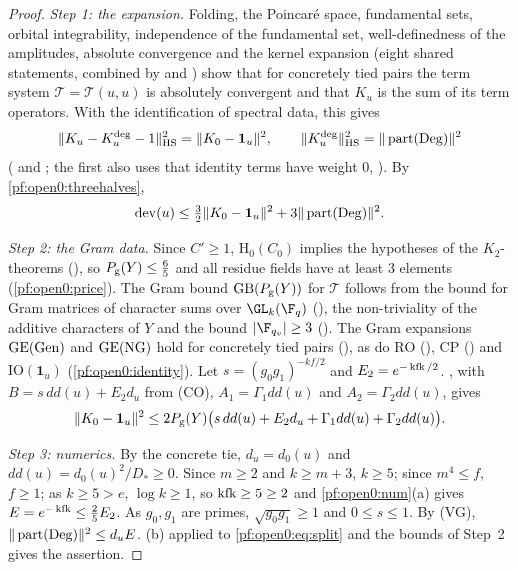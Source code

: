 \begin{proof}
\emph{Step 1: the expansion.} Folding, the Poincar\'e space, fundamental sets, orbital integrability, independence of the
fundamental set, well-definedness of the amplitudes, absolute convergence and the kernel expansion (eight shared
statements, combined by  and )
show that for concretely tied pairs the term system $\mathcal T=\mathcal T(u,u)$ is absolutely convergent and that $K_u$ is the
sum of its term operators. With the identification of spectral data, this gives
\[
\|K_u-K_u^{\mathrm{deg}}-1\|_{\mathrm{HS}}^2=\|K_0-\mathbf 1_u\|^2,\qquad\|K_u^{\mathrm{deg}}\|_{\mathrm{HS}}^2=\|\operatorname{part}(\mathrm{Deg})\|^2
\]
( and ; the first also uses that identity
terms have weight $0$, ). By \cref{pf:open0:threehalves},
\begin{equation}\label{pf:open0:eq:split}
\operatorname{dev}(u)\le\tfrac32\|K_0-\mathbf 1_u\|^2+3\|\operatorname{part}(\mathrm{Deg})\|^2 .
\end{equation}

\emph{Step 2: the Gram data.} Since $C'\ge1$, $\mathrm{H}_0(C_0)$ implies the hypotheses of the $K_2$-theorems
(), so $P_{\mathrm g}(Y)\le\frac65$ and all residue fields have at
least $3$ elements (\cref{pf:open0:price}). The Gram bound $\mathrm{GB}(P_{\mathrm g}(Y))$ for $\mathcal T$ follows from the bound for
Gram matrices of character sums over $\GL_k(\F_q)$ (), the non-triviality of the
additive characters of $Y$ and the bound $|\F_{q_v}|\ge3$ (). The Gram expansions
$\mathrm{GE}(\mathrm{Gen})$ and $\mathrm{GE}(\mathrm{NG})$ hold for concretely tied pairs
(), as do $\mathrm{RO}$ (),
$\mathrm{CP}$ () and $\mathrm{IO}(\mathbf 1_u)$ (\cref{pf:open0:identity}).
Let $s=(g_0g_1)^{-kf/2}$ and $E_2=e^{-\operatorname{kfk}/2}$. , with $B=s\,dd(u)+E_2d_u$ from (CO),
$A_1=\Gamma_1dd(u)$ and $A_2=\Gamma_2dd(u)$, gives
\[
\|K_0-\mathbf 1_u\|^2\le2P_{\mathrm g}(Y)\bigl(s\,dd(u)+E_2d_u+\Gamma_1dd(u)+\Gamma_2dd(u)\bigr).
\]

\emph{Step 3: numerics.} By the concrete tie, $d_u=d_0(u)$ and $dd(u)=d_0(u)^2/D_*\ge0$. Since $m\ge2$ and $k\ge m+3$, $k\ge5$;
since $m^4\le f$, $f\ge1$; as $k\ge5>e$, $\log k\ge1$, so $\operatorname{kfk}\ge5\ge2$ and \cref{pf:open0:num}(a) gives
$E=e^{-\operatorname{kfk}}\le\frac25E_2$. As $g_0,g_1$ are primes, $\sqrt{g_0g_1}\ge1$ and $0\le s\le1$. By (VG),
$\|\operatorname{part}(\mathrm{Deg})\|^2\le d_uE$. (b) applied to \eqref{pf:open0:eq:split} and the bounds of
Step~2 gives the assertion.
\end{proof}

